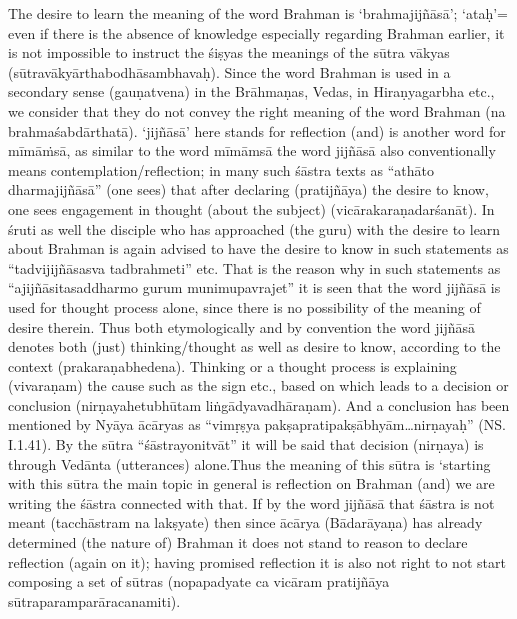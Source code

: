 The desire to learn the meaning of the word Brahman is ‘brahmajijñāsā’; ‘ataḥ’= even if there is the absence of knowledge especially regarding Brahman earlier, it is not impossible to instruct the śiṣyas the meanings of the sūtra vākyas (sūtravākyārthabodhāsambhavaḥ). Since the word Brahman is used in a secondary sense (gauṇatvena) in the Brāhmaṇas, Vedas, in Hiraṇyagarbha etc., we consider that they do not convey the right meaning of the word Brahman (na brahmaśabdārthatā). ‘jijñāsā’ here stands for reflection (and) is another word for mīmāṁsā, as similar to the word mīmāmsā the word jijñāsā also conventionally means contemplation/reflection; in many such śāstra texts as “athāto dharmajijñāsā” (one sees) that after declaring (pratijñāya) the desire to know, one sees engagement in thought (about the subject) (vicārakaraṇadarśanāt). In śruti as well the disciple who has approached (the guru) with the desire to learn about Brahman is again advised to have the desire to know in such statements as “tadvijijñā\-sasva tadbrahmeti” etc. That is the reason why in such statements as “ajijñāsitasaddharmo gurum munimupavrajet” it is seen that the word jijñāsā is used for thought process alone, since there is no possibility of the meaning of desire therein. Thus both etymologically and by convention the word jijñāsā denotes both (just) thinking/thought as well as desire to know, according to the context (prakaraṇabhedena). Thinking or a thought process is explaining (vivaraṇam) the cause such as the sign etc., based on which leads to a decision or conclusion (nirṇayahetubhūtam liṅ\-gādyavadhāraṇam). And a conclusion has been mentioned by Nyāya ācāryas as “vimṛṣya pakṣapratipakṣābhyām…nirṇayaḥ” (NS. I.1.41). By the sūtra “śāstrayonitvāt” it will be said that decision (nirṇaya) is through Vedānta (utterances) alone.\break Thus the meaning of this sūtra is ‘starting with this sūtra the main topic in general is reflection on Brahman (and) we are writing  the śāstra connected with that. If by the word jijñāsā that śāstra is not meant (tacchāstram na lakṣyate) then since ācārya (Bādarāyaṇa) has already determined (the nature of) Brahman it does not stand to reason to declare reflection (again on it); having promised reflection it is also not right to not start composing a set of sūtras (nopapadyate ca vicāram pratijñāya sūtraparamparāracanamiti).

